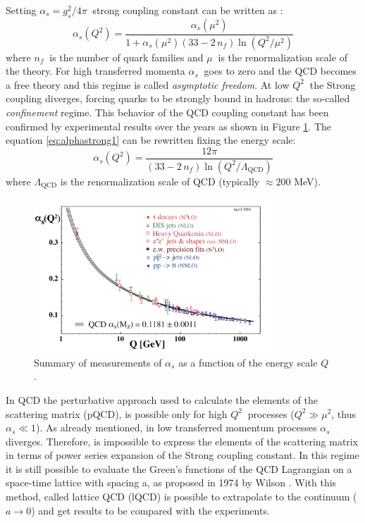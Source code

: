 Setting $\alpha_{s} = g^{2}_{s}/4\pi\ $ strong coupling constant can be written as \cite{pdg}:
\begin{equation} \label{eq:alphastrong1}
    \alpha_{s}(Q^{2}) = \frac{\alpha_{s}(\mu^{2})}{1 + \alpha_{s}(\mu^{2})(33 - 2\,n_{f})
    \ln(Q^{2}/\mu^{2})}
\end{equation}
where $n_{f}\ $ is the number of quark families and $\mu\ $ is the renormalization scale of 
the theory.
For high transferred momenta $\alpha_{s}\ $ goes to zero and the QCD becomes a free theory and 
this regime is called \textit{asymptotic freedom}. At low $Q^{2}\ $ the Strong coupling diverges,
forcing quarks to be strongly bound in hadrons: the so-called \textit{confinement} regime. 
This behavior of the QCD coupling constant has been confirmed by experimental results over the
years as shown in Figure \ref{fig:alpharun}.
The equation \ref{eq:alphastrong1} can be rewritten fixing the energy scale:
\begin{equation} \label{eq:alphastrong2}
    \alpha_{s}(Q^{2}) = \frac{12 \pi}{(33 - 2\,n_{f})\ln(Q^{2}/\Lambda_{\mathrm{QCD}})}
\end{equation}
where $\Lambda_{\mathrm{QCD}}$ is the renormalization scale of QCD (typically $\approx 200$ MeV).

\begin{figure}
    \captionsetup{justification=centering}
    \centering
    \includegraphics[width=0.8\textwidth]{gfx/alpharun}
	\caption{Summary of measurements of $\alpha_{s}$ as a function of the energy scale $Q$ \cite{pdg}.}
	\label{fig:alpharun}
\end{figure}

In QCD the perturbative approach used to calculate the elements of the scattering matrix (pQCD), is 
possible only for high $Q^{2}\ $ processes ($Q^{2} \gg \mu^{2}$, thus $\alpha_{s} \ll 1$).
As already mentioned, in low transferred momentum processes $\alpha_{s}$ diverges. 
Therefore, is impossible to express the elements of the scattering matrix in terms of power series
expansion of the Strong coupling constant.
In this regime it is still possible to evaluate the Green’s functions of the QCD Lagrangian
on a space-time lattice with spacing a, as proposed in 1974 by Wilson \cite{lattice}.
With this method, called lattice QCD (lQCD) is possible to extrapolate to the continuum 
($a \rightarrow 0$) and get results to be compared with the experiments.

